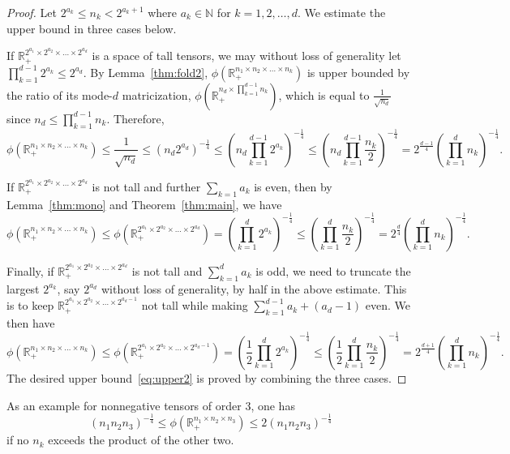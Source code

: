 \documentclass[11pt]{article}
\newcommand{\R}{\mathbb{R}}
\newcommand{\N}{\mathbb{N}}
\begin{document}
\begin{proof}
Let $2^{a_k}\le n_k<2^{a_k+1}$ where $a_k\in\N$ for $k=1,2,\dots,d$. We estimate the upper bound in three cases below.

If $\R_+^{2^{a_1}\times 2^{a_2}\times \dots \times 2^{a_d}}$ is a space of tall tensors, we may without loss of generality let $\prod_{k=1}^{d-1}2^{a_k}\le 2^{a_d}$. By Lemma~\ref{thm:fold2}, $\phi(\R_+^{n_1\times n_2\times \dots \times n_k})$ is upper bounded by the ratio of its mode-$d$ matricization, $\phi(\R_+^{n_d\times\prod_{k=1}^{d-1} n_k})$, which is equal to $\frac{1}{\sqrt{n_d}}$ since $n_d\le \prod_{k=1}^{d-1}n_k$. Therefore,
$$
\phi(\R_+^{n_1\times n_2\times \dots \times n_k}) \le
\frac{1}{\sqrt{n_d}} \le \left(n_d2^{a_d}\right)^{-\frac{1}{4}} \le
\left(n_d \prod_{k=1}^{d-1}2^{a_k} \right)^{-\frac{1}{4}}
\le \left(n_d \prod_{k=1}^{d-1}\frac{n_k}{2} \right)^{-\frac{1}{4}}
= 2^{\frac{d-1}{4}}\left(\prod_{k=1}^{d}n_k \right)^{-\frac{1}{4}}.
$$

If $\R_+^{2^{a_1}\times 2^{a_2}\times \dots \times 2^{a_d}}$ is not tall and further $\sum_{k=1}a_k$ is even, then by Lemma~\ref{thm:mono} and Theorem~\ref{thm:main}, we have
$$
\phi(\R_+^{n_1\times n_2\times \dots \times n_k}) \le
\phi(\R_+^{2^{a_1}\times 2^{a_2}\times \dots \times 2^{a_d}}) = \left(\prod_{k=1}^d 2^{a_k}\right)^{-\frac{1}{4}} \le
\left(\prod_{k=1}^d \frac{n_k}{2}\right)^{-\frac{1}{4}} = 2^{\frac{d}{4}}\left(\prod_{k=1}^d n_k\right)^{-\frac{1}{4}}.
$$

Finally, if $\R_+^{2^{a_1}\times 2^{a_2}\times \dots \times 2^{a_d}}$ is not tall and $\sum_{k=1}^da_k$ is odd, we need to truncate the largest $2^{a_k}$, say $2^{a_d}$ without loss of generality, by half in the above estimate. This is to keep $\R_+^{2^{a_1}\times 2^{a_2}\times \dots \times 2^{a_d-1}}$ not tall while making $\sum_{k=1}^{d-1} a_k + (a_d-1)$ even. We then have
$$
\phi(\R_+^{n_1\times n_2\times \dots \times n_k}) \le
\phi(\R_+^{2^{a_1}\times 2^{a_2}\times \dots \times 2^{a_d-1}}) = \left(\frac{1}{2}\prod_{k=1}^d 2^{a_k}\right)^{-\frac{1}{4}} \le
\left(\frac{1}{2}\prod_{k=1}^d \frac{n_k}{2}\right)^{-\frac{1}{4}} = 2^{\frac{d+1}{4}}\left(\prod_{k=1}^d n_k\right)^{-\frac{1}{4}}.
$$
The desired upper bound~\eqref{eq:upper2} is proved by combining the three cases.
\end{proof}

As an example for nonnegative tensors of order 3, one has
$$
(n_1n_2n_3)^{-\frac{1}{4}} \le  \phi(\R_+^{n_1\times n_2\times n_3}) \le 2 (n_1n_2n_3)^{-\frac{1}{4}}
$$
if no $n_k$ exceeds the product of the other two.
\end{document}
